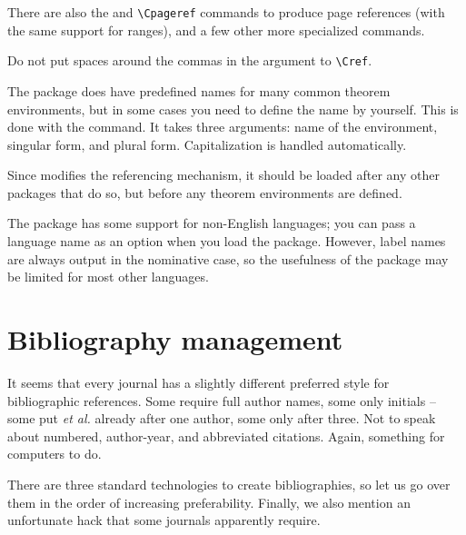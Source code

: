There are also the  and \verb|\Cpageref|
commands to produce page references (with the same support for ranges),
and a few other more specialized commands.

\begin{gotcha}
Do not put spaces around the commas in the argument to \verb|\Cref|.
\end{gotcha}


The package does have predefined names for many common theorem environments,
but in some cases you need to define the name by yourself.
This is done with the  command.
It takes three arguments: name of the environment, singular form, and plural form.
Capitalization is handled automatically.
%
\begin{ExampleCode}
\newtheorem{assumption}{Assumption}
\end{ExampleCode}



\begin{gotcha}
Since  modifies the referencing mechanism,
it should be loaded after any other packages that do so,
but before any theorem environments are defined.
\end{gotcha}

\begin{gotcha}
The  package has some support for non-English languages;
you can pass a language name as an option when you load the package.
However, label names are always output in the nominative case,
so the usefulness of the package may be limited for most other languages.
\end{gotcha}



%
%
%
\section{Bibliography management}\label{sec:bibliography}

It seems that every journal has a slightly different preferred style for bibliographic references.
Some require full author names, some only initials
-- some put \emph{et al.} already after one author, some only after three.
Not to speak about numbered, author-year, and abbreviated citations.
Again, something for computers to do.

There are three standard technologies to create bibliographies,
so let us go over them in the order of increasing preferability.
Finally, we also mention an unfortunate hack that some journals apparently require.


